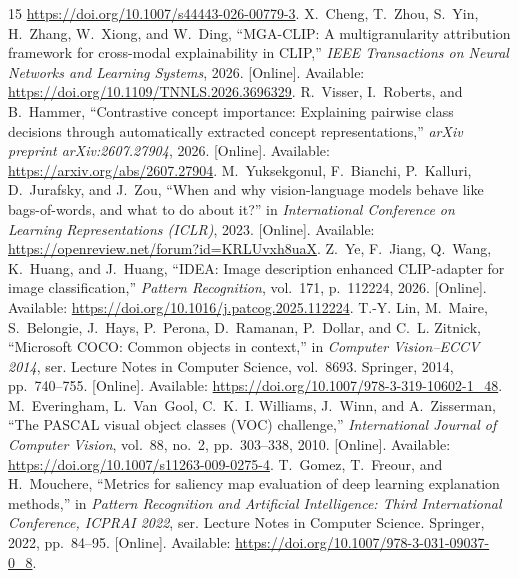 \begin{thebibliography}{15}
\url{https://doi.org/10.1007/s44443-026-00779-3}.
\newpage
{}
X.~Cheng, T.~Zhou, S.~Yin, H.~Zhang, W.~Xiong, and W.~Ding, ``{MGA-CLIP}: A
multigranularity attribution framework for cross-modal explainability in
{CLIP},'' \emph{IEEE Transactions on Neural Networks and Learning Systems},
2026. [Online]. Available:
\url{https://doi.org/10.1109/TNNLS.2026.3696329}.
R.~Visser, I.~Roberts, and B.~Hammer, ``Contrastive concept importance:
Explaining pairwise class decisions through automatically extracted concept
representations,'' \emph{arXiv preprint arXiv:2607.27904}, 2026. [Online]. Available:
\url{https://arxiv.org/abs/2607.27904}.
M.~Yuksekgonul, F.~Bianchi, P.~Kalluri, D.~Jurafsky, and J.~Zou, ``When and why
vision-language models behave like bags-of-words, and what to do about it?'' in
\emph{International Conference on Learning Representations (ICLR)}, 2023.
[Online]. Available: \url{https://openreview.net/forum?id=KRLUvxh8uaX}.
Z.~Ye, F.~Jiang, Q.~Wang, K.~Huang, and J.~Huang, ``{IDEA}: Image description
enhanced {CLIP}-adapter for image classification,'' \emph{Pattern Recognition},
vol.~171, p.~112224, 2026. [Online]. Available:
\url{https://doi.org/10.1016/j.patcog.2025.112224}.
T.-Y. Lin, M.~Maire, S.~Belongie, J.~Hays, P.~Perona, D.~Ramanan, P.~Dollar,
and C.~L. Zitnick, ``Microsoft {COCO}: Common objects in context,'' in
\emph{Computer Vision--ECCV 2014}, ser. Lecture Notes in Computer Science,
vol.~8693. Springer, 2014, pp.~740--755. [Online]. Available:
\url{https://doi.org/10.1007/978-3-319-10602-1_48}.
M.~Everingham, L.~Van~Gool, C.~K.~I. Williams, J.~Winn, and A.~Zisserman,
``The {PASCAL} visual object classes ({VOC}) challenge,'' \emph{International
Journal of Computer Vision}, vol.~88, no.~2, pp.~303--338, 2010. [Online]. Available:
\url{https://doi.org/10.1007/s11263-009-0275-4}.
T.~Gomez, T.~Freour, and H.~Mouchere, ``Metrics for saliency map evaluation of
deep learning explanation methods,'' in \emph{Pattern Recognition and
Artificial Intelligence: Third International Conference, ICPRAI 2022}, ser.
Lecture Notes in Computer Science. Springer, 2022, pp.~84--95. [Online]. Available:
\url{https://doi.org/10.1007/978-3-031-09037-0_8}.
\end{thebibliography}
